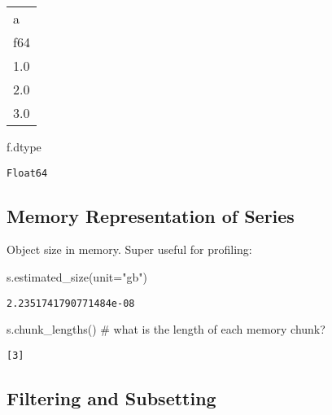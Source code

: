 \documentclass[
  letterpaper,
  DIV=11,
  numbers=noendperiod]{scrartcl}
\newenvironment{Shaded}{\begin{snugshade}}{\end{snugshade}}
\newcommand{\CommentTok}[1]{\textcolor[rgb]{0.37,0.37,0.37}{#1}}
\newcommand{\NormalTok}[1]{\textcolor[rgb]{0.00,0.23,0.31}{#1}}
\newcommand{\OperatorTok}[1]{\textcolor[rgb]{0.37,0.37,0.37}{#1}}
\newcommand{\StringTok}[1]{\textcolor[rgb]{0.13,0.47,0.30}{#1}}
\begin{document}
\begin{longtable}[]{@{}l@{}}
\toprule()
a \\
f64 \\
\midrule()
\endhead
1.0 \\
2.0 \\
3.0 \\
\bottomrule()
\end{longtable}

\begin{Shaded}
\begin{Highlighting}[]
\NormalTok{f.dtype}
\end{Highlighting}
\end{Shaded}

\begin{verbatim}
Float64
\end{verbatim}

\hypertarget{memory-representation-of-series}{%
\subsection{Memory Representation of
Series}\label{memory-representation-of-series}}

Object size in memory. Super useful for profiling:

\begin{Shaded}
\begin{Highlighting}[]
\NormalTok{s.estimated\_size(unit}\OperatorTok{=}\StringTok{"gb"}\NormalTok{)}
\end{Highlighting}
\end{Shaded}

\begin{verbatim}
2.2351741790771484e-08
\end{verbatim}

\begin{Shaded}
\begin{Highlighting}[]
\NormalTok{s.chunk\_lengths() }\CommentTok{\# what is the length of each memory chunk?}
\end{Highlighting}
\end{Shaded}

\begin{verbatim}
[3]
\end{verbatim}

\hypertarget{filtering-and-subsetting}{%
\subsection{Filtering and Subsetting}\label{filtering-and-subsetting}}
\end{document}
